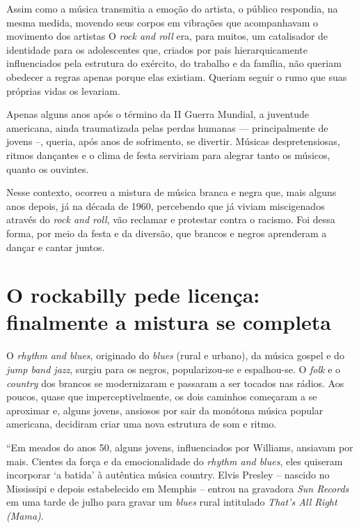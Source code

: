 Assim como a música transmitia a emoção do artista, o público respondia, na mesma medida, movendo 
seus corpos em vibrações que acompanhavam o movimento dos artistas \cite{FRI1996} O 
{\it rock and roll} era, para muitos, um catalisador de identidade para os adolescentes que, criados por 
pais hierarquicamente influenciados pela estrutura do exército, do trabalho e da família, não 
queriam obedecer a regras apenas porque elas existiam. Queriam seguir o rumo que suas próprias vidas 
os levariam.

Apenas alguns anos após o término da II Guerra Mundial, a juventude americana, ainda traumatizada 
pelas perdas humanas — principalmente de jovens –, queria, após anos de sofrimento, se divertir. 
Músicas despretensiosas, ritmos dançantes e o clima de festa serviriam para alegrar tanto os 
músicos, quanto os ouvintes.

Nesse contexto, ocorreu a mistura de música branca e negra que, mais alguns anos depois, já na 
década de 1960, percebendo que já viviam miscigenados através do {\it rock and roll}, vão reclamar e 
protestar contra o racismo.
Foi dessa forma, por meio da festa e da diversão, que brancos e negros aprenderam a dançar e cantar 
juntos.

\section {O rockabilly pede licença: finalmente a mistura se completa}

O {\it rhythm and blues}, originado do {\it blues} (rural e urbano), da música gospel e do {\it jump band 
jazz}, surgiu para 
os 
negros, popularizou-se e espalhou-se.
O {\it folk} e o {\it country} dos brancos se modernizaram e passaram a ser tocados nas rádios. Aos poucos, 
quase que imperceptivelmente, os dois caminhos começaram a se aproximar e, alguns jovens, ansiosos 
por sair da monótona música
popular americana, decidiram criar uma nova estrutura de som e ritmo.

“Em meados do anos 50, alguns jovens, influenciados por Williams, ansiavam por mais. Cientes da 
força e da emocionalidade do {\it rhythm and blues}, eles quiseram incorporar ‘a batida’ à autêntica 
música country. Elvis Presley – nascido no Mississipi e depois estabelecido em Memphis – entrou na 
gravadora {\it Sun Records} em uma tarde de julho para gravar um {\it blues} rural intitulado {\it That’s 
All 
Right 
(Mama)}.

